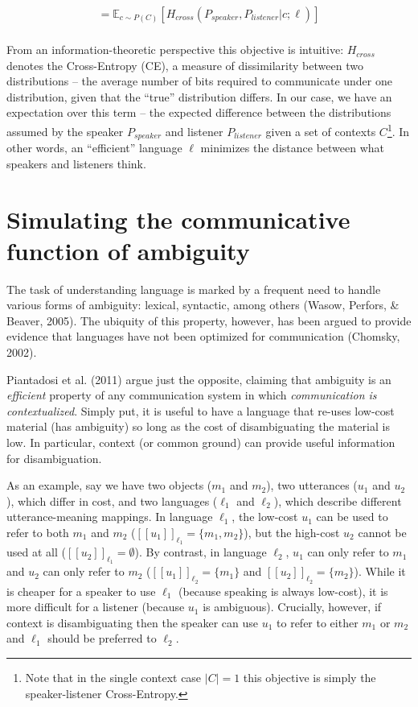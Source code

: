 \documentclass[10pt, letterpaper]{article}
\begin{document}
\begin{equation}
\begin{split}
  = \mathbb{E}_{c \sim P(C)}[H_{cross}(P_{speaker}, P_{listener} | c; \ell)]\\
\end{split}
\end{equation}

From an information-theoretic perspective this objective is intuitive:
\(H_{cross}\) denotes the Cross-Entropy (CE), a measure of dissimilarity
between two distributions -- the average number of bits required to
communicate under one distribution, given that the ``true'' distribution
differs. In our case, we have an expectation over this term -- the
expected difference between the distributions assumed by the speaker
\(P_{speaker}\) and listener \(P_{listener}\) given a set of contexts
\(C\)\footnote{Note that in the single context case $|C|=1$ this objective is simply the speaker-listener Cross-Entropy.}.
In other words, an ``efficient'' language \(\ell\) minimizes the
distance between what speakers and listeners think.

\section{Simulating the communicative function of
ambiguity}\label{simulating-the-communicative-function-of-ambiguity}

The task of understanding language is marked by a frequent need to
handle various forms of ambiguity: lexical, syntactic, among others
(Wasow, Perfors, \& Beaver, 2005). The ubiquity of this property,
however, has been argued to provide evidence that languages have not
been optimized for communication (Chomsky, 2002).

Piantadosi et al. (2011) argue just the opposite, claiming that
ambiguity is an \emph{efficient} property of any communication system in
which \emph{communication is contextualized}. Simply put, it is useful
to have a language that re-uses low-cost material (has ambiguity) so
long as the cost of disambiguating the material is low. In particular,
context (or common ground) can provide useful information for
disambiguation.\par

As an example, say we have two objects (\(m_1\) and \(m_2\)), two
utterances (\(u_1\) and \(u_2\)), which differ in cost, and two
languages (\(\ell_1\) and \(\ell_2\)), which describe different
utterance-meaning mappings. In language \(\ell_1\), the low-cost \(u_1\)
can be used to refer to both \(m_1\) and \(m_2\)
(\([[u_1]]_{\ell_1} = \{m_1, m_2 \}\)), but the high-cost \(u_2\) cannot
be used at all (\([[u_2]]_{\ell_1} = \emptyset\)). By contrast, in
language \(\ell_2\), \(u_1\) can only refer to \(m_1\) and \(u_2\) can
only refer to \(m_2\) (\([[u_1]]_{\ell_2} = \{m_1\}\) and
\([[u_2]]_{\ell_2} = \{m_2 \}\)). While it is cheaper for a speaker to
use \(\ell_1\) (because speaking is always low-cost), it is more
difficult for a listener (because \(u_1\) is ambiguous). Crucially,
however, if context is disambiguating then the speaker can use \(u_1\)
to refer to either \(m_1\) or \(m_2\) and \(\ell_1\) should be preferred
to \(\ell_2\).\par
\end{document}
